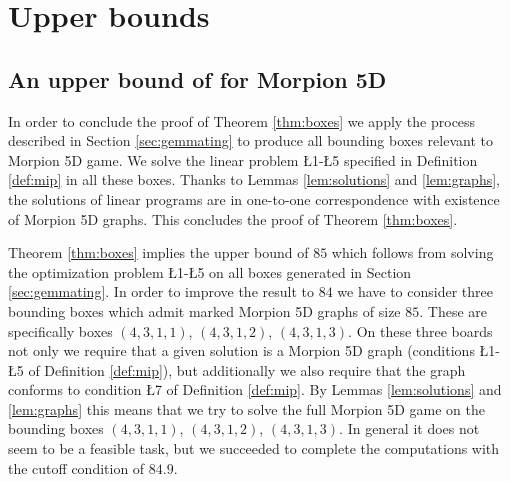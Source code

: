 \section{Upper bounds}
\label{sec:upper}

  
\subsection{An upper bound of \therecord for Morpion 5D}
\label{subsec:84}

In order to conclude the proof of Theorem \ref{thm:boxes} we apply the process described in Section \ref{sec:gemmating} to produce all bounding boxes relevant 
to Morpion 5D game. We solve the linear problem \L{1}-\L{5} specified in Definition \ref{def:mip} in all these boxes. Thanks to 
Lemmas \ref{lem:solutions} and \ref{lem:graphs}, the solutions of linear programs are in one-to-one correspondence with existence of
Morpion 5D graphs. This concludes the proof of Theorem \ref{thm:boxes}.


Theorem \ref{thm:boxes} implies the upper bound of $85$ which follows from solving the optimization
problem \L{1}-\L{5} on all boxes generated in Section \ref{sec:gemmating}. 
In order to improve the result to $84$ we have to consider three bounding boxes which admit marked Morpion 5D graphs of size $85$. These
are specifically boxes $(4,3,1,1)$, $(4,3,1,2)$, $(4,3,1,3)$.
On these three boards %
not only we require that a given solution is a 
Morpion 5D graph (conditions \L{1}-\L{5} of Definition \ref{def:mip}), but additionally we also require that the graph conforms to condition \L{7} of Definition \ref{def:mip}. 
By Lemmas \ref{lem:solutions} and \ref{lem:graphs} this means that we try to solve the full Morpion 5D game on the bounding boxes  $(4,3,1,1)$, $(4,3,1,2)$, $(4,3,1,3)$.
In general it does not seem to be a feasible task, but we succeeded to complete the computations with the cutoff condition of $84.9$.

